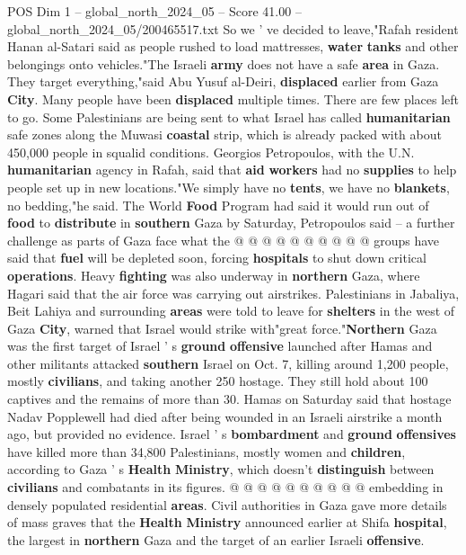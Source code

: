 \begin{textsample}{POS Dim 1 – global\_north\_2024\_05 – Score 41.00 – global\_north\_2024\_05/200465517.txt}
So we ' ve decided to leave,"Rafah resident Hanan al-Satari said as people rushed to load mattresses, \textbf{water} \textbf{tanks} and other belongings onto vehicles."The Israeli \textbf{army} does not have a safe \textbf{area} in Gaza.
They target everything,"said Abu Yusuf al-Deiri, \textbf{displaced} earlier from Gaza \textbf{City}.
Many people have been \textbf{displaced} multiple times.
There are few places left to go.
Some Palestinians are being sent to what Israel has called \textbf{humanitarian} safe zones along the Muwasi \textbf{coastal} strip, which is already packed with about 450,000 people in squalid conditions.
Georgios Petropoulos, with the U.N. \textbf{humanitarian} agency in Rafah, said that \textbf{aid} \textbf{workers} had no \textbf{supplies} to help people set up in new locations."We simply have no \textbf{tents}, we have no \textbf{blankets}, no bedding,"he said.
The World \textbf{Food} Program had said it would run out of \textbf{food} to \textbf{distribute} in \textbf{southern} Gaza by Saturday, Petropoulos said -- a further challenge as parts of Gaza face what the @ @ @ @ @ @ @ @ @ @ groups have said that \textbf{fuel} will be depleted soon, forcing \textbf{hospitals} to shut down critical \textbf{operations}.
Heavy \textbf{fighting} was also underway in \textbf{northern} Gaza, where Hagari said that the air force was carrying out airstrikes.
Palestinians in Jabaliya, Beit Lahiya and surrounding \textbf{areas} were told to leave for \textbf{shelters} in the west of Gaza \textbf{City}, warned that Israel would strike with"great force."\textbf{Northern} Gaza was the first target of Israel ' s \textbf{ground} \textbf{offensive} launched after Hamas and other militants attacked \textbf{southern} Israel on Oct. 7, killing around 1,200 people, mostly \textbf{civilians}, and taking another 250 hostage.
They still hold about 100 captives and the remains of more than 30.
Hamas on Saturday said that hostage Nadav Popplewell had died after being wounded in an Israeli airstrike a month ago, but provided no evidence.
Israel ' s \textbf{bombardment} and \textbf{ground} \textbf{offensives} have killed more than 34,800 Palestinians, mostly women and \textbf{children}, according to Gaza ' s \textbf{Health} \textbf{Ministry}, which doesn't \textbf{distinguish} between \textbf{civilians} and combatants in its figures. @ @ @ @ @ @ @ @ @ @ embedding in densely populated residential \textbf{areas}.
Civil authorities in Gaza gave more details of mass graves that the \textbf{Health} \textbf{Ministry} announced earlier at Shifa \textbf{hospital}, the largest in \textbf{northern} Gaza and the target of an earlier Israeli \textbf{offensive}.

\end{textsample}
